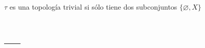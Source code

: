 \documentclass[palatino]{apuntes}
\begin{document}
\begin{defn}
$\tau$ es una topología trivial si sólo tiene dos subconjuntos $\{\varnothing,X\}$
\end{defn}











































\appendix

\chapter{---}


\printindex
\end{document}
